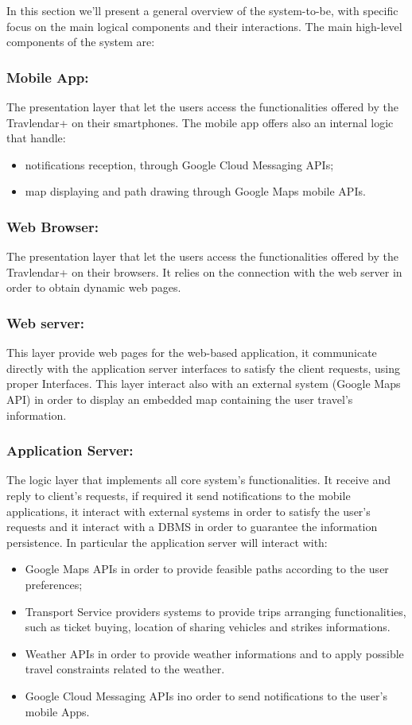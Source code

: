 In this section we'll present a general overview of the system-to-be, with specific focus on the main logical components and their interactions.\newline
The main high-level components of the system are:
\subsubsection{Mobile App:}
\label{subsubsect:Mobile App}
The presentation layer that let the users access the functionalities offered by the Travlendar+ on their smartphones. The mobile app offers also an internal logic that handle:
\begin{itemize}
\item notifications reception, through Google Cloud Messaging APIs;
\item map displaying and path drawing through Google Maps mobile APIs.
\end{itemize}  

\subsubsection{Web Browser:}
\label{subsubsect:Web Browser}
The presentation layer that let the users access the functionalities offered by the Travlendar+ on their browsers.
It relies on the connection with the web server in order to obtain dynamic web pages.
\subsubsection{Web server:}
\label{subsubsect:Web server}
This layer provide web pages for the web-based application, it communicate directly with the application server interfaces to satisfy the client requests, using proper Interfaces. This layer interact also with an external system (Google Maps API) in order to display an embedded map containing the user travel's information.

\subsubsection{Application Server:}
\label{subsubsect:Application Server}
The logic layer that implements all core system's functionalities. It receive and reply to client's requests, if required it send notifications to the mobile applications, it interact with external systems in order to satisfy the user's requests and it interact with a DBMS in order to guarantee the information persistence.
In particular the application server will interact with:
\begin{itemize}
\item Google Maps APIs in order to provide feasible paths according to the user preferences;
\item Transport Service providers systems to provide trips arranging functionalities, such as ticket buying, location of sharing vehicles and strikes informations.
\item Weather APIs in order to provide weather informations and to apply possible travel constraints related to the weather.
\item Google Cloud Messaging APIs ino order to send notifications to the user's mobile Apps.
\end{itemize} 

